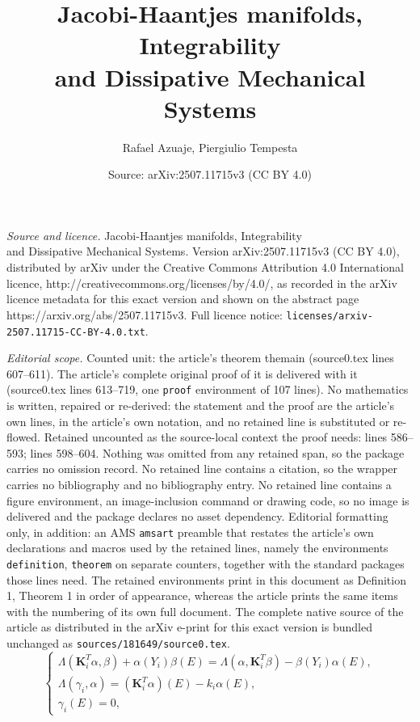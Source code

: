 \documentclass[10pt,a4paper]{amsart}
\title{Jacobi-Haantjes manifolds, Integrability \\ and Dissipative Mechanical Systems}
\author{Rafael Azuaje, Piergiulio Tempesta}
\date{Source: arXiv:2507.11715v3 (CC BY 4.0)}
\newcommand{\bs}{\boldsymbol}
\begin{document}
\maketitle

\noindent\emph{Source and licence.} Jacobi-Haantjes manifolds, Integrability \\ and Dissipative Mechanical Systems. Version arXiv:2507.11715v3 (CC BY 4.0), distributed by arXiv under the Creative Commons Attribution 4.0 International licence, http://creativecommons.org/licenses/by/4.0/, as recorded in the arXiv licence metadata for this exact version and shown on the abstract page https://arxiv.org/abs/2507.11715v3. Full licence notice: \texttt{licenses/arxiv-2507.11715-CC-BY-4.0.txt}.\par\smallskip

\noindent\textit{Editorial scope.} Counted unit: the article's theorem themain (source0.tex lines 607--611). The article's complete original proof of it is delivered with it (source0.tex lines 613--719, one \texttt{proof} environment of 107 lines). No mathematics is written, repaired or re-derived: the statement and the proof are the article's own lines, in the article's own notation, and no retained line is substituted or re-flowed.  Retained uncounted as the source-local context the proof needs: lines 586--593; lines 598--604.  Nothing was omitted from any retained span, so the package carries no omission record.  No retained line contains a citation, so the wrapper carries no bibliography and no bibliography entry.  No retained line contains a figure environment, an image-inclusion command or drawing code, so no image is delivered and the package declares no asset dependency.  Editorial formatting only, in addition: an AMS \texttt{amsart} preamble that restates the article's own declarations and macros used by the retained lines, namely the environments \texttt{definition}, \texttt{theorem} on separate counters, together with the standard packages those lines need.  The retained environments print in this document as Definition 1, Theorem 1 in order of appearance, whereas the article prints the same items with the numbering of its own full document.  The complete native source of the article as distributed in the arXiv e-print for this exact version is bundled unchanged as \texttt{sources/181649/source0.tex}.
\begin{equation}
\label{systemcc}
\left\lbrace \begin{array}{c}
\Lambda(\bs{K}_{i}^{T}\alpha,\beta)+\alpha(Y_{i})\beta(E)=\Lambda(\alpha,\bs{K}_{i}^{T}\beta)-\beta(Y_{i})\alpha(E), \\ 
\Lambda(\gamma_{i},\alpha)=(\bs{K}_{i}^{T}\alpha)(E)-k_{i}\alpha(E), \\ 
\gamma_{i}(E)=0,
\end{array} \right.
\end{equation}
\end{document}
